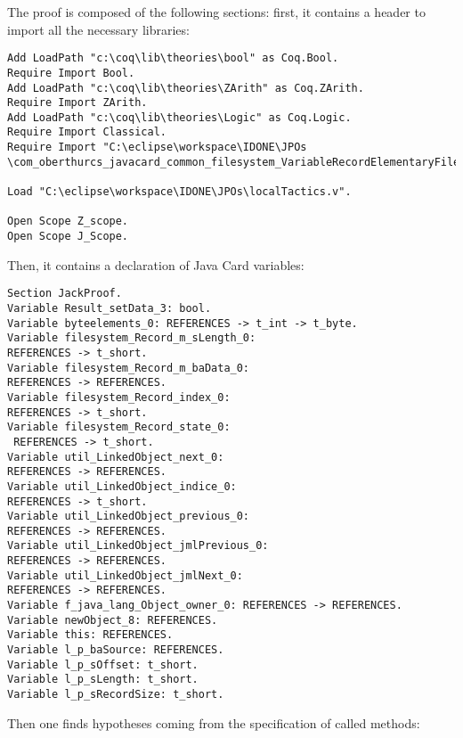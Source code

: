 The proof is composed of the following sections: first, it contains
a header to import all the necessary libraries:
\begin{lstlisting}
Add LoadPath "c:\coq\lib\theories\bool" as Coq.Bool.
Require Import Bool.
Add LoadPath "c:\coq\lib\theories\ZArith" as Coq.ZArith.
Require Import ZArith.
Add LoadPath "c:\coq\lib\theories\Logic" as Coq.Logic.
Require Import Classical.
Require Import "C:\eclipse\workspace\IDONE\JPOs
\com_oberthurcs_javacard_common_filesystem_VariableRecordElementaryFile".

Load "C:\eclipse\workspace\IDONE\JPOs\localTactics.v".

Open Scope Z_scope.
Open Scope J_Scope.
\end{lstlisting}
Then, it contains a declaration of Java Card variables:
\begin{lstlisting}
Section JackProof.
Variable Result_setData_3: bool.
Variable byteelements_0: REFERENCES -> t_int -> t_byte.
Variable filesystem_Record_m_sLength_0: 
REFERENCES -> t_short.
Variable filesystem_Record_m_baData_0: 
REFERENCES -> REFERENCES.
Variable filesystem_Record_index_0: 
REFERENCES -> t_short.
Variable filesystem_Record_state_0:
 REFERENCES -> t_short.
Variable util_LinkedObject_next_0: 
REFERENCES -> REFERENCES.
Variable util_LinkedObject_indice_0: 
REFERENCES -> t_short.
Variable util_LinkedObject_previous_0: 
REFERENCES -> REFERENCES.
Variable util_LinkedObject_jmlPrevious_0: 
REFERENCES -> REFERENCES.
Variable util_LinkedObject_jmlNext_0: 
REFERENCES -> REFERENCES.
Variable f_java_lang_Object_owner_0: REFERENCES -> REFERENCES.
Variable newObject_8: REFERENCES.
Variable this: REFERENCES.
Variable l_p_baSource: REFERENCES.
Variable l_p_sOffset: t_short.
Variable l_p_sLength: t_short.
Variable l_p_sRecordSize: t_short.
\end{lstlisting}
Then one finds hypotheses coming from the specification of called methods:
